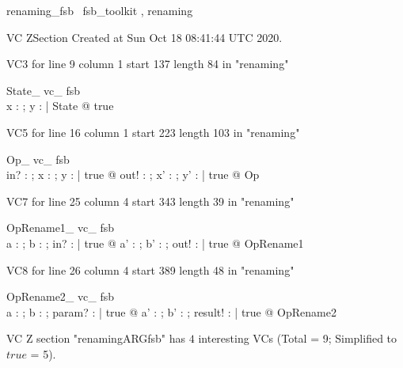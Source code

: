 \documentclass{article}
\begin{document}

\begin{zsection}	 \SECTION renaming\_fsb \parents~fsb\_toolkit , renaming
\end{zsection}

VC ZSection Created at Sun Oct 18 08:41:44 UTC 2020.

VC3 for line 9 column 1 start 137 length 84 in "renaming"
\begin{theorem}{ State\_ vc\_ fsb}\\
 \exists x : \nat ; y : \power \nat | State @ true \\

\end{theorem}

VC5 for line 16 column 1 start 223 length 103 in "renaming"
\begin{theorem}{ Op\_ vc\_ fsb}\\
 \forall in? : \nat ; x : \nat ; y : \power \nat | true @ \exists out! : \nat ; x' : \nat ; y' : \power \nat | true @ Op \\

\end{theorem}

VC7 for line 25 column 4 start 343 length 39 in "renaming"
\begin{theorem}{ OpRename1\_ vc\_ fsb}\\
 \forall a : \nat ; b : \power \nat ; in? : \nat | true @ \exists a' : \nat ; b' : \power \nat ; out! : \nat | true @ OpRename1 \\

\end{theorem}

VC8 for line 26 column 4 start 389 length 48 in "renaming"
\begin{theorem}{ OpRename2\_ vc\_ fsb}\\
 \forall a : \nat ; b : \power \nat ; param? : \nat | true @ \exists a' : \nat ; b' : \power \nat ; result! : \nat | true @ OpRename2 \\

\end{theorem}



 VC Z section "renamingARGfsb" has $4$ interesting VCs (Total = 9; Simplified to $true$ = 5).



\end{document}
